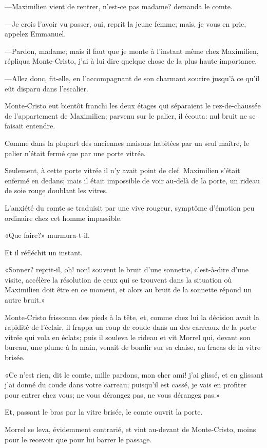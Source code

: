 —Maximilien vient de rentrer, n'est-ce pas madame? demanda le comte. 

—Je crois l'avoir vu passer, oui, reprit la jeune femme; mais, je vous en prie, appelez Emmanuel. 

—Pardon, madame; mais il faut que je monte à l'instant même chez Maximilien, répliqua Monte-Cristo, j'ai à lui dire quelque chose de la plus haute importance. 

—Allez donc, fit-elle, en l'accompagnant de son charmant sourire jusqu'à ce qu'il eût disparu dans l'escalier. 

Monte-Cristo eut bientôt franchi les deux étages qui séparaient le rez-de-chaussée de l'appartement de Maximilien; parvenu sur le palier, il écouta: nul bruit ne se faisait entendre. 

Comme dans la plupart des anciennes maisons habitées par un seul maître, le palier n'était fermé que par une porte vitrée. 

Seulement, à cette porte vitrée il n'y avait point de clef. Maximilien s'était enfermé en dedans; mais il était impossible de voir au-delà de la porte, un rideau de soie rouge doublant les vitres. 

L'anxiété du comte se traduisit par une vive rougeur, symptôme d'émotion peu ordinaire chez cet homme impassible. 

«Que faire?» murmura-t-il. 

Et il réfléchit un instant. 

«Sonner? reprit-il, oh! non! souvent le bruit d'une sonnette, c'est-à-dire d'une visite, accélère la résolution de ceux qui se trouvent dans la situation où Maximilien doit être en ce moment, et alors au bruit de la sonnette répond un autre bruit.» 

Monte-Cristo frissonna des pieds à la tête, et, comme chez lui la décision avait la rapidité de l'éclair, il frappa un coup de coude dans un des carreaux de la porte vitrée qui vola en éclats; puis il souleva le rideau et vit Morrel qui, devant son bureau, une plume à la main, venait de bondir sur sa chaise, au fracas de la vitre brisée. 

«Ce n'est rien, dit le comte, mille pardons, mon cher ami! j'ai glissé, et en glissant j'ai donné du coude dans votre carreau; puisqu'il est cassé, je vais en profiter pour entrer chez vous; ne vous dérangez pas, ne vous dérangez pas.» 

Et, passant le bras par la vitre brisée, le comte ouvrit la porte. 

Morrel se leva, évidemment contrarié, et vint au-devant de Monte-Cristo, moins pour le recevoir que pour lui barrer le passage. 

